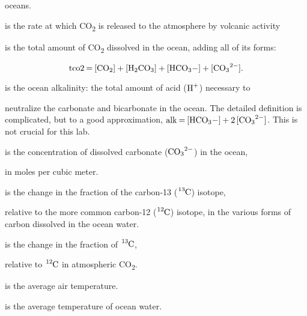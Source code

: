 \documentclass[
]{article}
\providecommand{\tightlist}{%
  \setlength{\itemsep}{0pt}\setlength{\parskip}{0pt}}
\begin{document}
oceans.

\begin{description}
\tightlist
\item[Degas]
is the rate at which CO\textsubscript{2} is released to the atmosphere
by volcanic activity
\item[tCO2]
is the total amount of CO\textsubscript{2} dissolved in the ocean,
adding all of its forms:
\end{description}

\[ \ce{\text{tco2} = [CO2] + [H2CO3] + [HCO3-] + [CO3^{2-}]}. \]

\begin{description}
\tightlist
\item[alk]
is the ocean alkalinity: the total amount of acid (\(\ce{H+}\))
necessary to
\end{description}

neutralize the carbonate and bicarbonate in the ocean. The detailed
definition is complicated, but to a good approximation,
\(\ce{\text{alk} = [HCO3-] + 2 [CO3^{2-}]}\). This is not crucial for
this lab.

\begin{description}
\tightlist
\item[CO3]
is the concentration of dissolved carbonate (\(\ce{CO3^{2-}}\)) in the
ocean,
\end{description}

in moles per cubic meter.

\begin{description}
\tightlist
\item[d13Cocn]
is the change in the fraction of the carbon-13 (\(\ce{^{13}C}\))
isotope,
\end{description}

relative to the more common carbon-12 (\(\ce{^{12}C}\)) isotope, in the
various forms of carbon dissolved in the ocean water.

\begin{description}
\tightlist
\item[d13Catm]
is the change in the fraction of \(\ce{^{13}C}\),
\end{description}

relative to \(\ce{^{12}C}\) in atmospheric CO\textsubscript{2}.

\begin{description}
\tightlist
\item[Tatm]
is the average air temperature.
\item[Tocn]
is the average temperature of ocean water.
\end{description}
\end{document}
